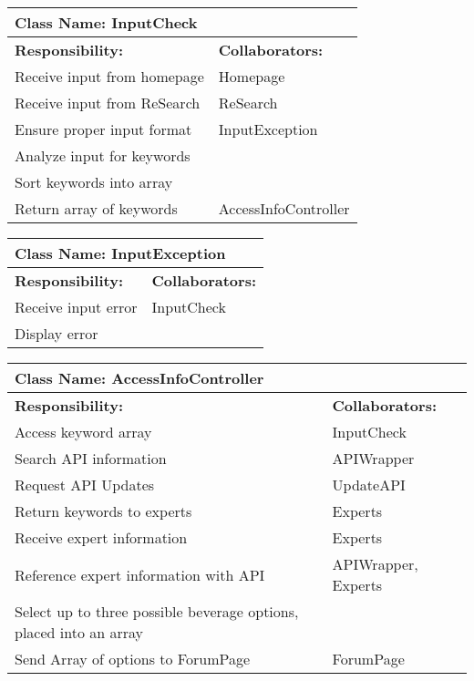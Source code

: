 \documentclass[]{article}
\begin{document}
	\begin{table}[ht]
		\centering
		\begin{tabular}{|p{5cm}|p{5cm}|}
			\hline 
			\multicolumn{2}{|l|}{\textbf{Class Name: InputCheck}} \\
			\hline
			\textbf{Responsibility:} & \textbf{Collaborators:} \\
			\hline
			Receive input from homepage  & Homepage\\
			\hline
			Receive input from ReSearch & ReSearch\\
			\hline
			Ensure proper input format & InputException\\
			\hline
			Analyze input for keywords & \\
			\hline
			Sort keywords into array & \\
			\hline 
			Return array of keywords & AccessInfoController\\
			\hline 
		\end{tabular}
	\end{table}	

	\begin{table}[ht]
		\centering
		\begin{tabular}{|p{5cm}|p{5cm}|}
			\hline 
			\multicolumn{2}{|l|}{\textbf{Class Name: InputException}} \\
			\hline
			\textbf{Responsibility:} & \textbf{Collaborators:} \\
			\hline
			Receive input error  & InputCheck\\
			\hline
			Display error & \\
			\hline
		\end{tabular}
	\end{table}	
	
	\begin{table}[ht]
		\centering
		\begin{tabular}{|p{5cm}|p{5cm}|}
			\hline 
			\multicolumn{2}{|l|}{\textbf{Class Name: AccessInfoController}} \\
			\hline
			\textbf{Responsibility:} & \textbf{Collaborators:} \\
			\hline
			Access keyword array  & InputCheck\\
			\hline
			Search API information & APIWrapper\\
			\hline
			Request API Updates & UpdateAPI\\
			\hline
			Return keywords to experts & Experts\\
			\hline
			Receive expert information & Experts\\
			\hline
			Reference expert information with API & APIWrapper, Experts\\
			\hline
			Select up to three possible beverage options, placed into an array & \\
			\hline
			Send Array of options to ForumPage & ForumPage \\
			\hline
			
		\end{tabular}
	\end{table}	
	
\end{document}
